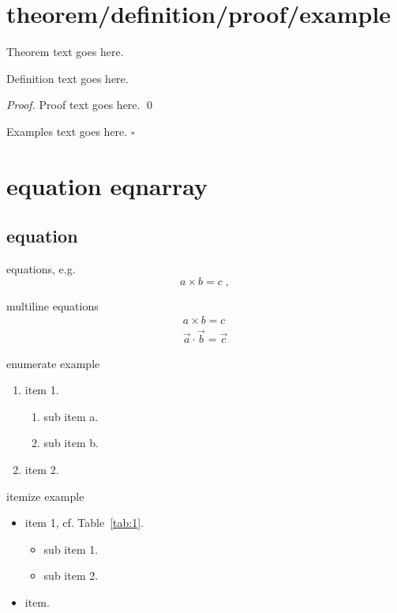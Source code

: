 \chapter{theorem/definition/proof/example}
\begin{theorem}
	Theorem text goes here.
\end{theorem}

%
\begin{definition}
	Definition text goes here.
\end{definition}

\begin{proof}
	Proof text goes here.
	\qed
\end{proof}

\begin{example}
	Examples text goes here.  \hfill$\square$ 
\end{example}

\chapter{equation eqnarray}
\label{intro} %

\section{equation}
equations, e.g.
\begin{equation}
a \times b = c\;,
\end{equation}

multiline equations
\begin{eqnarray}
a \times b = c \nonumber\\
\vec{a} \cdot \vec{b}=\vec{c}
\label{eq:01}
\end{eqnarray}

enumerate example
\begin{enumerate}
	\item{item 1.}
	\begin{enumerate}
		\item{sub item a.}
		\item{sub item b.}
	\end{enumerate}
	\item{item 2.}
\end{enumerate}

itemize example
\begin{itemize}
	\item{item 1, cf. Table~\ref{tab:1}.}
	\begin{itemize}
		\item{sub item 1.}
		\item{sub item 2.}
	\end{itemize}
	\item{item.}
\end{itemize}

